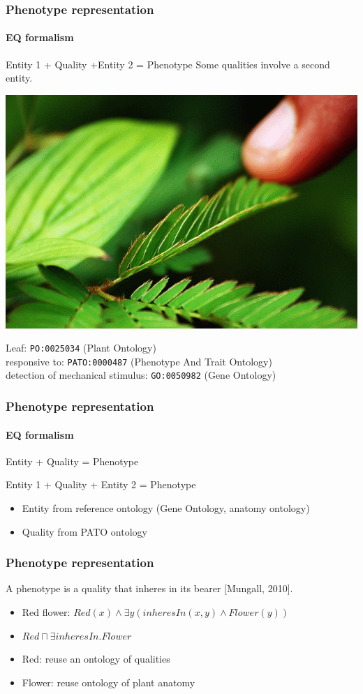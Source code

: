 \documentclass{beamer}
\begin{document}
\begin{frame}
\frametitle{Phenotype representation}
\framesubtitle{EQ formalism}
\begin{block}{Entity 1 + Quality +Entity 2 = Phenotype}
Some qualities involve a second entity.
\end{block}

\centerline{\includegraphics[width=.5\textwidth]{Plant_response_to_stimuli.png}}

\pause
Leaf: {\tt PO:0025034} (Plant Ontology)\\
\pause
responsive to: {\tt PATO:0000487} (Phenotype And Trait Ontology)\\
\pause
detection of mechanical stimulus: {\tt GO:0050982} (Gene Ontology)
\end{frame}

\begin{frame}
\frametitle{Phenotype representation}
\framesubtitle{EQ formalism}
Entity + Quality = Phenotype

Entity 1 + Quality + Entity 2 = Phenotype
\begin{itemize}
\item Entity from reference ontology (Gene Ontology, anatomy ontology)
\item Quality from PATO ontology
\end{itemize}
\end{frame}

\begin{frame}
  \frametitle{Phenotype representation}
  A phenotype is a quality that inheres in its bearer [Mungall, 2010].
  \begin{itemize}
  \item Red flower:
    $Red(x) \land \exists y ( inheresIn(x,y) \land Flower(y))$
  \item $Red \sqcap \exists inheresIn.Flower$
  \item Red: reuse an ontology of qualities
  \item Flower: reuse ontology of plant anatomy
  \end{itemize}
\end{frame}
\end{document}
